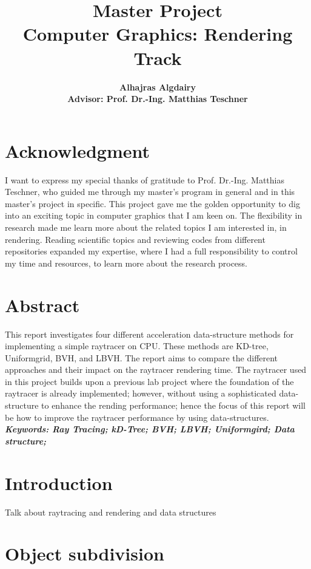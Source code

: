 \documentclass[11pt,a4paper]{article}
\begin{document}
	
	\title{\textbf{Master Project \\ Computer Graphics: Rendering Track}}
	\author{\textbf{Alhajras Algdairy} \\ \textbf{Advisor: Prof. 
			Dr.-Ing. Matthias Teschner}}
	\maketitle
	
	\section*{\centering Acknowledgment}
	I want to express my special thanks of gratitude to Prof. Dr.-Ing. Matthias Teschner, who guided me through my master's program in general and in this master's project in specific. This project gave me the golden opportunity to dig into an exciting topic in computer graphics that I am keen on. The flexibility in research made me learn more about the related topics I am interested in, in rendering. Reading scientific topics and reviewing codes from different repositories expanded my expertise, where I had a full responsibility to control my time and resources, to learn more about the research process. 	
	
	\section*{\centering Abstract}
	This report investigates four different acceleration data-structure methods for implementing a simple raytracer on CPU. These methods are KD-tree, Uniformgrid, BVH, and LBVH. The report aims to compare the different approaches and their impact on the raytracer rendering time. The raytracer used in this project builds upon a previous lab project where the foundation of the raytracer is already implemented; however, without using a sophisticated data-structure to enhance the rending performance; hence the focus of this report will be how to improve the raytracer performance by using data-structures. 
	\textbf{\textit{Keywords: Ray Tracing; kD-Tree; BVH; LBVH; Uniformgird; Data structure;}}
	
	\section{Introduction}
	Talk about raytracing and rendering and data structures
	
	\section{Object subdivision}
\end{document}
